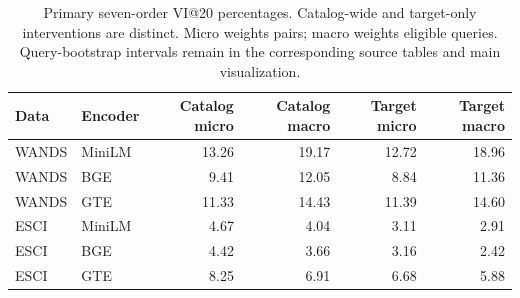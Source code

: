 \begin{table}[tp]
\caption{Primary seven-order VI@20 percentages. Catalog-wide and target-only interventions are distinct. Micro weights pairs; macro weights eligible queries. Query-bootstrap intervals remain in the corresponding source tables and main visualization.}\label{tab:sensitivitydetail}
\centering\small
\begin{tabular}{llrrrr}\toprule
Data & Encoder & Catalog micro & Catalog macro & Target micro & Target macro\\\midrule
WANDS & MiniLM & 13.26 & 19.17 & 12.72 & 18.96\\
WANDS & BGE & 9.41 & 12.05 & 8.84 & 11.36\\
WANDS & GTE & 11.33 & 14.43 & 11.39 & 14.60\\
ESCI & MiniLM & 4.67 & 4.04 & 3.11 & 2.91\\
ESCI & BGE & 4.42 & 3.66 & 3.16 & 2.42\\
ESCI & GTE & 8.25 & 6.91 & 6.68 & 5.88\\
\bottomrule\end{tabular}
\end{table}
